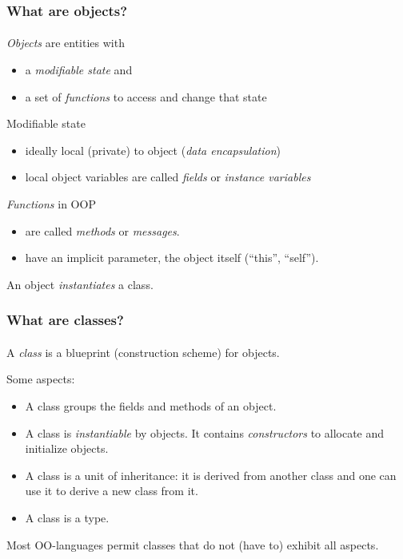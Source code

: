 \documentclass{beamer}
\begin{document}
\begin{frame}[fragile]
\frametitle{What are objects?}
\framesubtitle{}

\emph{Objects} are entities with 
\begin{itemize}
  \item a \emph{modifiable state} and 
  \item a set of \emph{functions} to access and change that state
\end{itemize}

\pause\medskip

Modifiable state 
\begin{itemize}
  \item ideally local (private) to object (\emph{data encapsulation})
  \item local object variables are called \emph{fields} or
    \emph{instance variables} 
\end{itemize}

\pause\medskip

\emph{Functions} in OOP
\begin{itemize}
\item are called \textit{methods} or \textit{messages}.
\item have an implicit parameter, the object itself (``this'', ``self'').
\end{itemize}

\pause\medskip

An object \textit{instantiates} a class.
\end{frame}

\begin{frame}[fragile]
\frametitle{What are classes?}
\framesubtitle{}

A \emph{class} is a blueprint (construction scheme) for objects.

\bigskip

Some aspects:

\begin{itemize}
\item A class groups the fields and methods of an object.
\item A class is \textit{instantiable} by objects.
It contains \textit{constructors} to allocate and initialize objects.
\item A class is a unit of inheritance: it is derived from another
class and one can use it to derive a new class from it. 
\item A class is a type. 
\end{itemize}
\bigskip
Most OO-languages permit classes that do not (have to) exhibit all aspects. 
\end{frame}
\end{document}
